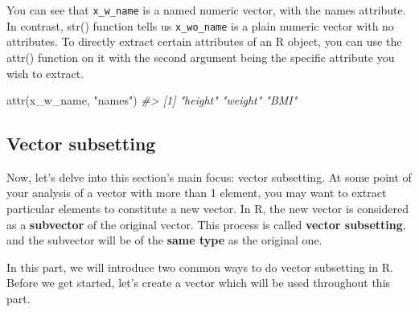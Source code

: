 \documentclass[
]{book}
\newenvironment{Shaded}{\begin{snugshade}}{\end{snugshade}}
\newcommand{\CommentTok}[1]{\textcolor[rgb]{0.56,0.35,0.01}{\textit{#1}}}
\newcommand{\DecValTok}[1]{\textcolor[rgb]{0.00,0.00,0.81}{#1}}
\newcommand{\FunctionTok}[1]{\textcolor[rgb]{0.00,0.00,0.00}{#1}}
\newcommand{\NormalTok}[1]{#1}
\newcommand{\OtherTok}[1]{\textcolor[rgb]{0.56,0.35,0.01}{#1}}
\newcommand{\StringTok}[1]{\textcolor[rgb]{0.31,0.60,0.02}{#1}}
\begin{document}
\begin{Shaded}
\end{Shaded}

You can see that \texttt{x\_w\_name} is a named numeric vector, with the names attribute. In contrast, str() function tells us \texttt{x\_wo\_name} is a plain numeric vector with no attributes. To directly extract certain attributes of an R object, you can use the attr() function on it with the second argument being the specific attribute you wish to extract.

\begin{Shaded}
\begin{Highlighting}[]
\FunctionTok{attr}\NormalTok{(x\_w\_name, }\StringTok{"names"}\NormalTok{)}
\CommentTok{\#\textgreater{} [1] "height" "weight" "BMI"}
\end{Highlighting}
\end{Shaded}

\hypertarget{vector-subsetting}{%
\subsection{Vector subsetting}\label{vector-subsetting}}

Now, let's delve into this section's main focus: vector subsetting. At some point of your analysis of a vector with more than 1 element, you may want to extract particular elements to constitute a new vector. In R, the new vector is considered as a \textbf{subvector} of the original vector. This process is called \textbf{vector subsetting}, and the subvector will be of the \textbf{same type} as the original one.

In this part, we will introduce two common ways to do vector subsetting in R. Before we get started, let's create a vector which will be used throughout this part.
\end{document}
